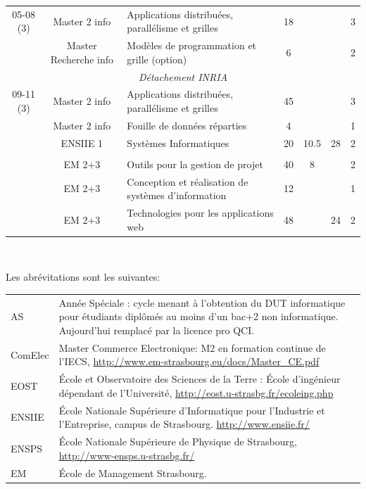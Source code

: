 \documentclass[11pt]{article}
\begin{document}
\begin{center}
{\begin{tabular}{|c|c|p{5cm}|c|c|c|c|}
\hline
05-08 (3)
	& Master 2 info		& Applications distribuées, parallélisme et grilles	&  18	& & & 3 \\
	& Master Recherche info	& Modèles de programmation et grille (option) 		& 6	& & & 2 \\
\hline

\multicolumn{7}{|c|}{\textit{Détachement INRIA}}\\  \hline
09-11 (3)
	& Master 2 info		& Applications distribuées, parallélisme et grilles	&  45	&   &   & 3 \\
	& Master 2 info		& Fouille de données réparties			&  4	&   &   & 1 \\
	& ENSIIE 1		& Systèmes Informatiques				& 20	& 10.5 & 28 & 2 \\ 
&&&&&&\\
	& EM 2+3		& Outils pour la gestion de projet			&  40	& 8 &   & 2 \\
	& EM 2+3		& Conception et réalisation de systèmes d'information	&  12	&   &   & 1 \\
	& EM 2+3		& Technologies pour les applications web		&  48	&   & 24& 2 \\
	
\hline
\end{tabular}\\
}

\end{center}

\noindent
Les abrévitations sont les suivantes:\\

\begin{small}
\begin{tabular}{lp{14cm}}
AS		& Année Spéciale : cycle menant à l'obtention du DUT informatique 
		pour étudiants diplômés au moins d'un bac+2 non informatique. Aujourd'hui remplacé par la licence pro QCI.\\ 
ComElec	& Master Commerce Electronique: M2 en formation continue de l'IECS, \url{http://www.em-strasbourg.eu/docs/Master_CE.pdf}\\
EOST 		& \'Ecole et Observatoire des Sciences de la Terre : \'Ecole d'ingénieur dépendant de l'Université, \url{http://eost.u-strasbg.fr/ecoleing.php}\\
ENSIIE	& \'Ecole Nationale Supérieure d'Informatique pour l'Industrie et l'Entreprise, campus de Strasbourg. \url{http://www.ensiie.fr/}\\
ENSPS		& \'Ecole Nationale Supérieure de Physique de Strasbourg, \url{http://www-ensps.u-strasbg.fr/}\\
EM		& \'Ecole de Management Strasbourg. \\
\end{tabular}
\end{small}
\end{document}
